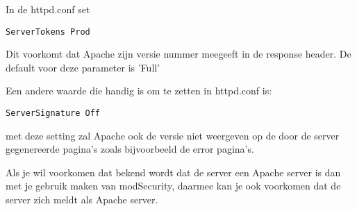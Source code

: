In de httpd.conf set
\begin{lstlisting}
ServerTokens Prod
\end{lstlisting}
Dit voorkomt dat Apache zijn versie nummer meegeeft in de response header. De default voor deze parameter is 'Full'

Een andere waarde die handig is om te zetten in httpd.conf is:
\begin{lstlisting}
ServerSignature Off
\end{lstlisting}
met deze setting zal Apache ook de versie niet weergeven op de door de server gegenereerde pagina's zoals bijvoorbeeld de error pagina's.

Als je wil voorkomen dat bekend wordt dat de server een Apache server is dan met je gebruik maken van modSecurity, daarmee kan je ook voorkomen dat de server zich meldt als Apache server.
